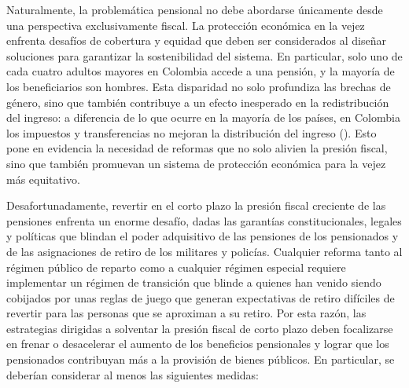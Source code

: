 Naturalmente, la problemática pensional no debe abordarse únicamente desde una perspectiva exclusivamente fiscal. La protección económica en la vejez enfrenta desafíos de cobertura y equidad que deben ser considerados al diseñar soluciones para garantizar la sostenibilidad del sistema. En particular, solo uno de cada cuatro adultos mayores en Colombia accede a una pensión, y la mayoría de los beneficiarios son hombres. Esta disparidad no solo profundiza las brechas de género, sino que también contribuye a un efecto inesperado en la redistribución del ingreso: a diferencia de lo que ocurre en la mayoría de los países, en Colombia los impuestos y transferencias no mejoran la distribución del ingreso (\cite{Nunez2020}). Esto pone en evidencia la necesidad de reformas que no solo alivien la presión fiscal, sino que también promuevan un sistema de protección económica para la vejez más equitativo.  

Desafortunadamente, revertir en el corto plazo la presión fiscal creciente de las pensiones enfrenta un enorme desafío, dadas las garantías constitucionales, legales y políticas que blindan el poder adquisitivo de las pensiones de los pensionados y de las asignaciones de retiro de los militares y policías. Cualquier reforma tanto al régimen público de reparto como a cualquier régimen especial requiere implementar un régimen de transición que blinde a quienes han venido siendo cobijados por unas reglas de juego que generan expectativas de retiro difíciles de revertir para las personas que se aproximan a su retiro. Por esta razón, las estrategias dirigidas a solventar la presión fiscal de corto plazo deben focalizarse en frenar o desacelerar el aumento de los beneficios pensionales y lograr que los pensionados contribuyan más a la provisión de bienes públicos. En particular, se deberían considerar al menos las siguientes medidas: 


